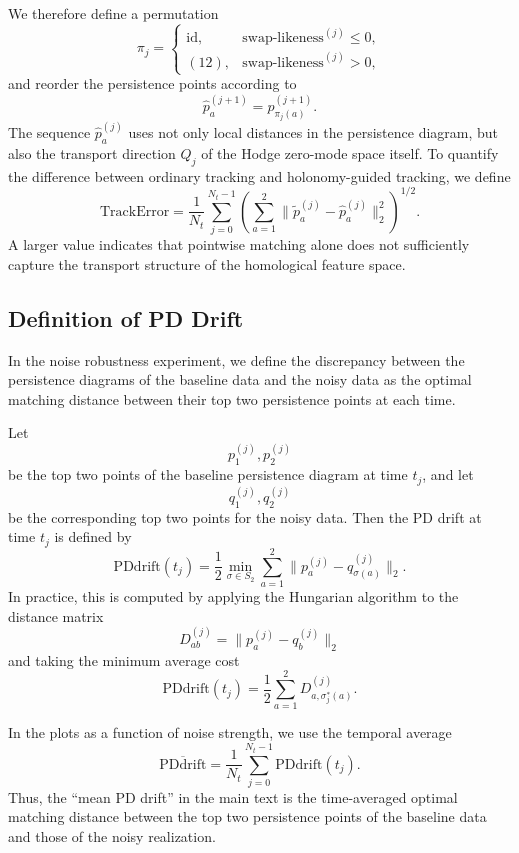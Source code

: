 \documentclass[pdflatex,sn-mathphys-num]{sn-jnl}%
\theoremstyle{thmstyleone}%
\theoremstyle{thmstyletwo}%
\theoremstyle{thmstylethree}%
\begin{document}
\begin{appendices}
We therefore define a permutation
\[
\pi_j
=
\begin{cases}
\mathrm{id}, & \mathrm{swap\text{-}likeness}^{(j)}\le 0,\\[4pt]
(12), & \mathrm{swap\text{-}likeness}^{(j)}>0,
\end{cases}
\]
and reorder the persistence points according to
\[
\widehat p_a^{(j+1)}
=
p_{\pi_j(a)}^{(j+1)}.
\]
The sequence \(\widehat p_a^{(j)}\) uses not only local distances in the persistence diagram, but also the transport direction \(Q_j\) of the Hodge zero-mode space itself. To quantify the difference between ordinary tracking and holonomy-guided tracking, we define
\[
\mathrm{TrackError}
=
\frac{1}{N_t}
\sum_{j=0}^{N_t-1}
\left(
\sum_{a=1}^2
\|
\widetilde p_a^{(j)}-\widehat p_a^{(j)}
\|_2^2
\right)^{1/2}.
\]
A larger value indicates that pointwise matching alone does not sufficiently capture the transport structure of the homological feature space.

\subsection{Definition of PD Drift}

In the noise robustness experiment, we define the discrepancy between the persistence diagrams of the baseline data and the noisy data as the optimal matching distance between their top two persistence points at each time.

Let
\[
p_1^{(j)},p_2^{(j)}
\]
be the top two points of the baseline persistence diagram at time \(t_j\), and let
\[
q_1^{(j)},q_2^{(j)}
\]
be the corresponding top two points for the noisy data. Then the PD drift at time \(t_j\) is defined by
\[
\mathrm{PDdrift}(t_j)
=
\frac{1}{2}
\min_{\sigma\in S_2}
\sum_{a=1}^2
\|p_a^{(j)}-q_{\sigma(a)}^{(j)}\|_2.
\]
In practice, this is computed by applying the Hungarian algorithm to the distance matrix
\[
D_{ab}^{(j)}
=
\|p_a^{(j)}-q_b^{(j)}\|_2
\]
and taking the minimum average cost
\[
\mathrm{PDdrift}(t_j)
=
\frac{1}{2}
\sum_{a=1}^2
D_{a,\sigma_j^\ast(a)}^{(j)}.
\]

In the plots as a function of noise strength, we use the temporal average
\[
\overline{\mathrm{PDdrift}}
=
\frac{1}{N_t}
\sum_{j=0}^{N_t-1}
\mathrm{PDdrift}(t_j).
\]
Thus, the ``mean PD drift'' in the main text is the time-averaged optimal matching distance between the top two persistence points of the baseline data and those of the noisy realization.



\end{appendices}
\end{document}
